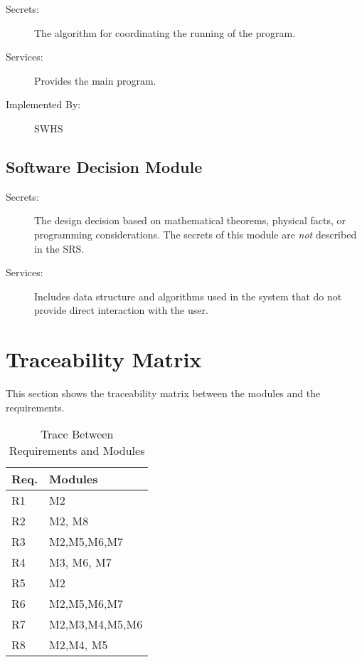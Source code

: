 \documentclass[12pt]{article}
\begin{document}
\begin{description}
\item[Secrets:] The algorithm for coordinating the running of the program.
\item[Services:] Provides the main program.
\item[Implemented By:] SWHS
\end{description}


\subsection{Software Decision Module}


\begin{description}
\item[Secrets:] The design decision based on mathematical theorems, physical
  facts, or programming considerations. The secrets of this module are
  \emph{not} described in the SRS.
\item[Services:] Includes data structure and algorithms used in the system that
  do not provide direct interaction with the user. 

\end{description}



\section{Traceability Matrix} \label{SecTM}

This section shows the traceability matrix between the modules and the
requirements.

\begin{table}[H]
\centering
\begin{tabular}{p{} p{}}
\toprule
\textbf{Req.} & \textbf{Modules}\\
\midrule
R1 & M2\\
R2 & M2, M8\\
R3 & M2,M5,M6,M7\\
R4 & M3, M6, M7\\
R5 & M2\\
R6 & M2,M5,M6,M7\\
R7 & M2,M3,M4,M5,M6\\
R8 & M2,M4, M5\\
\bottomrule
\end{tabular}
\caption{Trace Between Requirements and Modules}
\label{TblRT}
\end{table}
\end{document}
